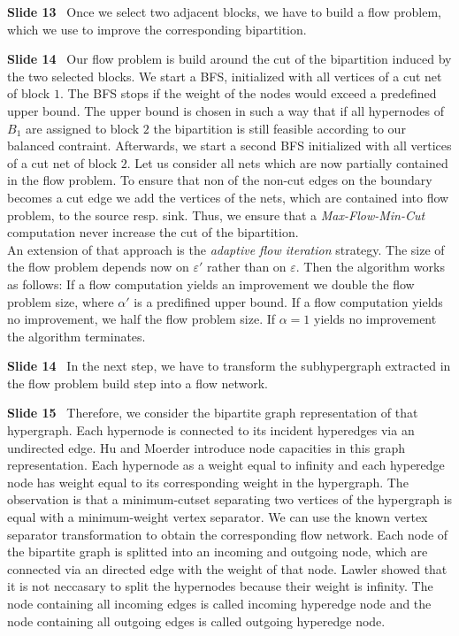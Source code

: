 \documentclass[11pt]{llncs}
\newcommand{\fakepar}[1]{\medskip\par\textbf{#1}\ }
\begin{document}
\fakepar{Slide 13} Once we select two adjacent blocks, we have to build a flow problem, which
we use to improve the corresponding bipartition.

\fakepar{Slide 14} Our flow problem is build around the cut of the bipartition induced by
the two selected blocks. We start a BFS, initialized with all vertices of a cut net of block $1$.
The BFS stops if the weight of the nodes would exceed a predefined upper bound. The upper bound
is chosen in such a way that if all hypernodes of $B_1$ are assigned to block $2$ the bipartition is
still feasible according to our balanced contraint. Afterwards, we start a second BFS initialized
with all vertices of a cut net of block $2$. Let us consider all nets which are now partially
contained in the flow problem. To ensure that non of the non-cut edges on the boundary becomes
a cut edge we add the vertices of the nets, which are contained into flow problem, to the source
resp. sink. Thus, we ensure that a \emph{Max-Flow-Min-Cut} computation never increase the
cut of the bipartition. \\
An extension of that approach is the \emph{adaptive flow iteration} strategy. The size
of the flow problem depends now on $\varepsilon'$ rather than on $\varepsilon$. Then the
algorithm works as follows: If a flow computation yields an improvement we double the flow problem
size, where $\alpha'$ is a predifined upper bound. If a flow computation yields no improvement, we half
the flow problem size. If $\alpha = 1$ yields no improvement the algorithm terminates.

\fakepar{Slide 14} In the next step, we have to transform the subhypergraph extracted
in the flow problem build step into a flow network.

\fakepar{Slide 15} Therefore, we consider the bipartite graph representation of that
hypergraph. Each hypernode is connected to its incident hyperedges via an undirected
edge. Hu and Moerder introduce node capacities in this graph representation. Each hypernode
as a weight equal to infinity and each hyperedge node has weight equal to its corresponding
weight in the hypergraph. The observation is that a minimum-cutset separating two vertices
of the hypergraph is equal with a minimum-weight vertex separator. We can use the known
vertex separator transformation to obtain the corresponding flow network. Each node of the bipartite
graph is splitted into an incoming and outgoing node, which are connected via an directed edge with
the weight of that node. Lawler showed that it is not neccasary to split the hypernodes because
their weight is infinity. The node containing all incoming edges is called incoming hyperedge node
and the node containing all outgoing edges is called outgoing hyperedge node.
\end{document}
